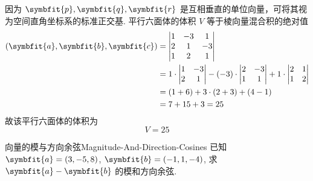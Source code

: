 \begin{solution}
    因为 $\symbfit{p}, \symbfit{q}, \symbfit{r}$ 是互相垂直的单位向量，可将其视为空间直角坐标系的标准正交基. 平行六面体的体积 $V$ 等于棱向量混合积的绝对值
    \begin{equation*}
        \begin{aligned}
            (\symbfit{a}, \symbfit{b}, \symbfit{c}) & = \begin{vmatrix} 1 & -3 & 1 \\ 2 & 1 & -3 \\ 1 & 2 & 1 \end{vmatrix}                                                                                                     \\
                                                    & = 1 \cdot \begin{vmatrix} 1 & -3 \\ 2 & 1 \end{vmatrix} - (-3) \cdot \begin{vmatrix} 2 & -3 \\ 1 & 1 \end{vmatrix} + 1 \cdot \begin{vmatrix} 2 & 1 \\ 1 & 2 \end{vmatrix} \\
                                                    & = (1 + 6) + 3 \cdot (2 + 3) + (4 - 1)                                                                                                                                     \\
                                                    & = 7 + 15 + 3 = 25
        \end{aligned}
    \end{equation*}
    故该平行六面体的体积为
    \begin{equation*}
        \boxed{V = 25}
    \end{equation*}
\end{solution}


\begin{problem}{向量的模与方向余弦}{Magnitude-And-Direction-Cosines}
    已知 $\symbfit{a} = (3, -5, 8)$, $\symbfit{b} = (-1, 1, -4)$, 求 $\symbfit{a} - \symbfit{b}$ 的模和方向余弦.
\end{problem}

